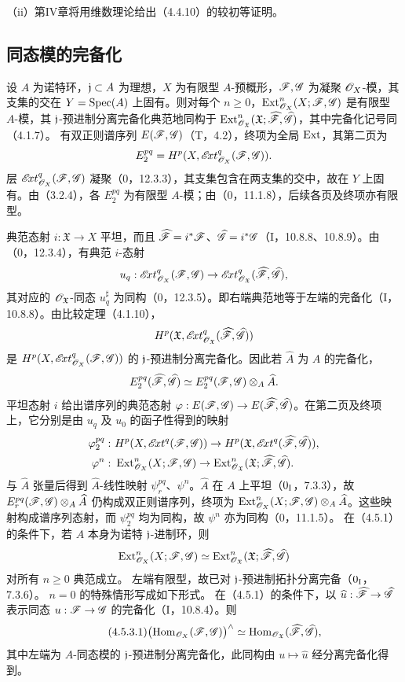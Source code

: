 （ii）第IV章将用维数理论给出（4.4.10）的较初等证明。

\subsection{同态模的完备化}
设 $A$ 为诺特环，$\mathfrak j\subset A$ 为理想，$X$ 为有限型 $A$-预概形，$\mathscr F,\mathscr G$ 为凝聚 $\mathscr O_X$-模，其支集的交在 $Y=\operatorname{Spec}(A)$ 上固有。则对每个 $n\ge0$，$\operatorname{Ext}^n_{\mathscr O_X}(X;\mathscr F,\mathscr G)$ 是有限型 $A$-模，其 $\mathfrak j$-预进制分离完备化典范地同构于 $\operatorname{Ext}^n_{\mathscr O_{\mathfrak X}}(\mathfrak X;\widehat{\mathscr F},\widehat{\mathscr G})$，其中完备化记号同（4.1.7）。
\eproof
有双正则谱序列 $E(\mathscr F,\mathscr G)$（T，4.2），终项为全局 $\operatorname{Ext}$，其第二页为
\[
E_2^{pq}=H^p(X,\mathscr{E}\!xt^q_{\mathscr O_X}(\mathscr F,\mathscr G)).
\]
层 $\mathscr{E}\!xt^q_{\mathscr O_X}(\mathscr F,\mathscr G)$ 凝聚（0，12.3.3），其支集包含在两支集的交中，故在 $Y$ 上固有。由（3.2.4），各 $E_2^{pq}$ 为有限型 $A$-模；由（0，11.1.8），后续各页及终项亦有限型。

典范态射 $i:\mathfrak X\to X$ 平坦，而且 $\widehat{\mathscr F}=i^*\mathscr F$、$\widehat{\mathscr G}=i^*\mathscr G$（I，10.8.8、10.8.9）。由（0，12.3.4），有典范 $i$-态射
\[
u_q:\mathscr{E}\!xt^q_{\mathscr O_X}(\mathscr F,\mathscr G)\to
\mathscr{E}\!xt^q_{\mathscr O_{\mathfrak X}}(\widehat{\mathscr F},\widehat{\mathscr G}),
\]
其对应的 $\mathscr O_{\mathfrak X}$-同态 $u_q^\sharp$ 为同构（0，12.3.5）。即右端典范地等于左端的完备化（I，10.8.8）。由比较定理（4.1.10），
\[
H^p(\mathfrak X,\mathscr{E}\!xt^q_{\mathscr O_{\mathfrak X}}(\widehat{\mathscr F},\widehat{\mathscr G}))
\]
是 $H^p(X,\mathscr{E}\!xt^q_{\mathscr O_X}(\mathscr F,\mathscr G))$ 的 $\mathfrak j$-预进制分离完备化。因此若 $\widehat A$ 为 $A$ 的完备化，
\[
E_2^{pq}(\widehat{\mathscr F},\widehat{\mathscr G})
\simeq E_2^{pq}(\mathscr F,\mathscr G)\otimes_A\widehat A.
\]
平坦态射 $i$ 给出谱序列的典范态射 $\varphi:E(\mathscr F,\mathscr G)\to E(\widehat{\mathscr F},\widehat{\mathscr G})$。在第二页及终项上，它分别是由 $u_q$ 及 $u_0$ 的函子性得到的映射
\[
\begin{aligned}
\varphi_2^{pq}:&\ H^p(X,\mathscr{E}\!xt^q(\mathscr F,\mathscr G))\to
H^p(\mathfrak X,\mathscr{E}\!xt^q(\widehat{\mathscr F},\widehat{\mathscr G})),\\
\varphi^n:&\ \operatorname{Ext}^n_{\mathscr O_X}(X;\mathscr F,\mathscr G)\to
\operatorname{Ext}^n_{\mathscr O_{\mathfrak X}}(\mathfrak X;\widehat{\mathscr F},\widehat{\mathscr G}).
\end{aligned}
\]
与 $\widehat A$ 张量后得到 $\widehat A$-线性映射 $\psi_r^{pq}$、$\psi^n$。$\widehat A$ 在 $A$ 上平坦（$0_{\mathrm I}$，7.3.3），故 $E_r^{pq}(\mathscr F,\mathscr G)\otimes_A\widehat A$ 仍构成双正则谱序列，终项为 $\operatorname{Ext}^n_{\mathscr O_X}(X;\mathscr F,\mathscr G)\otimes_A\widehat A$。这些映射构成谱序列态射，而 $\psi_2^{pq}$ 均为同构，故 $\psi^n$ 亦为同构（0，11.1.5）。\finishproof
{}
在（4.5.1）的条件下，若 $A$ 本身为诺特 $\mathfrak j$-进制环，则
\[
\operatorname{Ext}^n_{\mathscr O_X}(X;\mathscr F,\mathscr G)\simeq
\operatorname{Ext}^n_{\mathscr O_{\mathfrak X}}(\mathfrak X;\widehat{\mathscr F},\widehat{\mathscr G})
\]
对所有 $n\ge0$ 典范成立。
\eproof
左端有限型，故已对 $\mathfrak j$-预进制拓扑分离完备（$0_{\mathrm I}$，7.3.6）。\finishproof
$n=0$ 的特殊情形写成如下形式。
在（4.5.1）的条件下，以 $\widehat u:\widehat{\mathscr F}\to\widehat{\mathscr G}$ 表示同态 $u:\mathscr F\to\mathscr G$ 的完备化（I，10.8.4）。则
\begin{equation}\tag{4.5.3.1}
\bigl(\operatorname{Hom}_{\mathscr O_X}(\mathscr F,\mathscr G)\bigr)^\wedge
\simeq\operatorname{Hom}_{\mathscr O_{\mathfrak X}}(\widehat{\mathscr F},\widehat{\mathscr G}),
\end{equation}
其中左端为 $A$-同态模的 $\mathfrak j$-预进制分离完备化，此同构由 $u\mapsto\widehat u$ 经分离完备化得到。\par

